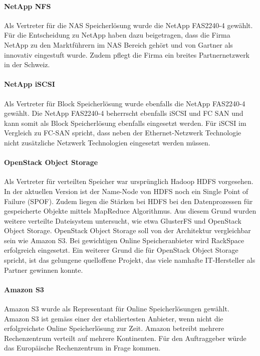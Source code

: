 \paragraph{NetApp NFS}\label{Al-2}
Als Vertreter für die NAS Speicherlösung wurde die NetApp FAS2240-4 gewählt. Für die Entscheidung zu NetApp haben dazu beigetragen, dass die Firma NetApp zu den Marktführern im NAS Bereich gehört und von Gartner als innovativ eingestuft wurde. Zudem pflegt die Firma ein breites Partnernetzwerk in der Schweiz.

\paragraph{NetApp iSCSI}\label{Al-3}
Als Vertreter für Block Speicherlösung wurde ebenfalls die NetApp FAS2240-4 gewählt. Die NetApp FAS2240-4 beherrscht ebenfalls iSCSI und FC SAN und kann somit als Block Speicherlösung ebenfalls eingesetzt werden. Für iSCSI im Vergleich zu FC-SAN spricht, dass neben der Ethernet-Netzwerk Technologie nicht zusätzliche Netzwerk Technologien eingesetzt werden müssen.

\paragraph{OpenStack Object Storage}\label{Al-4}

Als Vertreter für verteilten Speicher war ursprünglich Hadoop HDFS vorgesehen. In der aktuellen Version ist der Name-Node von HDFS noch ein Single Point of Failure (SPOF). Zudem liegen die Stärken bei HDFS bei den Datenprozessen für gespeicherte Objekte mittels MapReduce Algorithmus. Aus diesem Grund wurden weitere verteilte Dateisystem untersucht, wie etwa GlusterFS und OpenStack Object Storage. OpenStack Object Storage soll von der Architektur vergleichbar sein wie Amazon S3. Bei gewichtigen Online Speicheranbieter wird RackSpace erfolgreich eingesetzt. Ein weiterer Grund die für OpenStack Object Storage spricht, ist das gelungene quelloffene Projekt, das viele namhafte IT-Hersteller als Partner gewinnen konnte.

\paragraph{Amazon S3}\label{Al-5}
Amazon S3 wurde als Representant für Online Speicherlösungen gewählt. Amazon S3 ist gemäss  einer der etabliertesten Anbieter, wenn nicht die erfolgreichste Online Speicherlösung zur Zeit. Amazon betreibt mehrere Rechenzentrum verteilt auf mehrere Kontinenten. Für den Auftraggeber würde das Europäische Rechenzentrum in Frage kommen.


